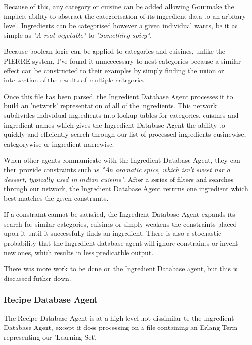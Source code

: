 \documentclass[9pt,titlepage,a4paper]{extarticle}
\begin{document}
    Because of this, any category or cuisine can be added allowing Gourmake the implicit ability to abstract the 
    categorisation of its ingredient data to an arbitary level. Ingredients can be categorised however a given individual wants, 
    be it as simple as \textit{"A root vegetable"} to \textit{"Something spicy"}. 

    Because boolean logic can be applied to categories and cuisines, unlike the PIERRE system, I've found it
    unneccessary to nest categories because a similar effect can be constructed to their examples by simply
    finding the union or intersection of the results of multiple categories.

    Once this file has been parsed, the Ingredient Database Agent processes it to build an 'network' representation
    of all of the ingredients. This network subdivides individual ingredients into lookup tables for categories, cuisines 
    and ingredient names which gives the Ingredient Database Agent the ability to quickly and efficiently search through
    our list of processed ingredients cusinewise, categorywise or ingredient namewise.

    When other agents communicate with the Ingredient Database Agent, they can then provide constraints such as
    \textit{"An aromatic spice, which isn't sweet nor a dessert, typically used in indian cuisine"}. After a series of filters
    and searches through our network, the Ingredient Database Agent returns one ingredient which best matches the
    given constraints.

    If a constraint cannot be satisfied, the Ingredient Database Agent expands its search for similar categories,
    cuisines or simply weakens the constraints placed upon it until it successfully finds an ingredient. There is
    also a stochastic probability that the Ingredient database agent will ignore constraints or invent new ones,
    which results in less predicatble output. 

    There was more work to be done on the Ingredient Database agent, but this is discussed futher down.

\subsubsection{Recipe Database Agent}
    The Recipe Database Agent is at a high level not dissimilar to the Ingredient Database Agent, except it does
    processing on a file containing an Erlang Term representing our 'Learning Set'. 
\end{document}
